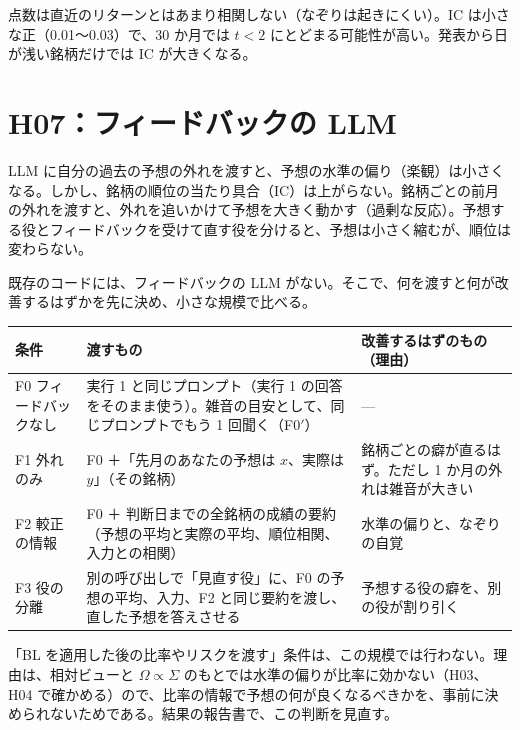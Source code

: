 \documentclass[xelatex,ja=standard,jafont=haranoaji,a4paper,10pt,openany]{bxjsreport}
\begin{document}
\begin{predbox}
点数は直近のリターンとはあまり相関しない（なぞりは起きにくい）。IC は小さな正（0.01〜0.03）で、30 か月では $t<2$ にとどまる可能性が高い。発表から日が浅い銘柄だけでは IC が大きくなる。
\end{predbox}

\chapter{H07：フィードバックの LLM}\label{ch:h07}

\begin{hypbox}
LLM に自分の過去の予想の外れを渡すと、予想の水準の偏り（楽観）は小さくなる。しかし、銘柄の順位の当たり具合（IC）は上がらない。銘柄ごとの前月の外れを渡すと、外れを追いかけて予想を大きく動かす（過剰な反応）。予想する役とフィードバックを受けて直す役を分けると、予想は小さく縮むが、順位は変わらない。
\end{hypbox}

既存のコードには、フィードバックの LLM がない。そこで、何を渡すと何が改善するはずかを先に決め、小さな規模で比べる。

\begin{center}
\small
\begin{tabular}{p{2.6cm}p{6.2cm}p{5.4cm}}
\toprule
条件 & 渡すもの & 改善するはずのもの（理由） \\
\midrule
F0 フィードバックなし & 実行 1 と同じプロンプト（実行 1 の回答をそのまま使う）。雑音の目安として、同じプロンプトでもう 1 回聞く（F0$'$） & --- \\
F1 外れのみ & F0 ＋「先月のあなたの予想は $x$、実際は $y$」（その銘柄） & 銘柄ごとの癖が直るはず。ただし 1 か月の外れは雑音が大きい \\
F2 較正の情報 & F0 ＋ 判断日までの全銘柄の成績の要約（予想の平均と実際の平均、順位相関、入力との相関） & 水準の偏りと、なぞりの自覚 \\
F3 役の分離 & 別の呼び出しで「見直す役」に、F0 の予想の平均、入力、F2 と同じ要約を渡し、直した予想を答えさせる & 予想する役の癖を、別の役が割り引く \\
\bottomrule
\end{tabular}
\end{center}

「BL を適用した後の比率やリスクを渡す」条件は、この規模では行わない。理由は、相対ビューと $\Omega\propto\Sigma$ のもとでは水準の偏りが比率に効かない（H03、H04 で確かめる）ので、比率の情報で予想の何が良くなるべきかを、事前に決められないためである。結果の報告書で、この判断を見直す。
\end{document}
